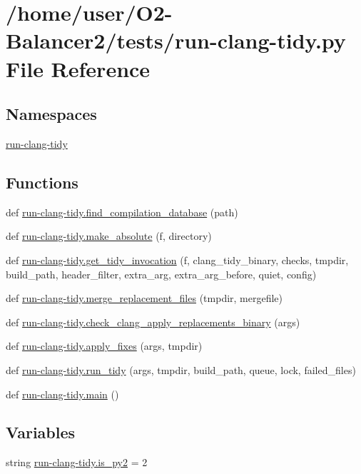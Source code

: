 \hypertarget{run-clang-tidy_8py}{}\section{/home/user/\+O2-\/\+Balancer2/tests/run-\/clang-\/tidy.py File Reference}
\label{run-clang-tidy_8py}
\subsection*{Namespaces}
\begin{DoxyCompactItemize}
\item 
 \hyperlink{namespacerun-clang-tidy}{run-\/clang-\/tidy}
\end{DoxyCompactItemize}
\subsection*{Functions}
\begin{DoxyCompactItemize}
\item 
def \hyperlink{namespacerun-clang-tidy_a6ac4a700cc424f234d870957b05abb6e}{run-\/clang-\/tidy.\+find\+\_\+compilation\+\_\+database} (path)
\item 
def \hyperlink{namespacerun-clang-tidy_a0cea255a2d9edf0a7f877bd9bdd4c75f}{run-\/clang-\/tidy.\+make\+\_\+absolute} (f, directory)
\item 
def \hyperlink{namespacerun-clang-tidy_a3cbee7957a6ad49d8a88b9c9d74a53dc}{run-\/clang-\/tidy.\+get\+\_\+tidy\+\_\+invocation} (f, clang\+\_\+tidy\+\_\+binary, checks, tmpdir, build\+\_\+path, header\+\_\+filter, extra\+\_\+arg, extra\+\_\+arg\+\_\+before, quiet, config)
\item 
def \hyperlink{namespacerun-clang-tidy_ad3aaf1ecd87ad237a6e5caeeaa4a6ad6}{run-\/clang-\/tidy.\+merge\+\_\+replacement\+\_\+files} (tmpdir, mergefile)
\item 
def \hyperlink{namespacerun-clang-tidy_ac9da9a27018bf1740f1f26c5f7657b7a}{run-\/clang-\/tidy.\+check\+\_\+clang\+\_\+apply\+\_\+replacements\+\_\+binary} (args)
\item 
def \hyperlink{namespacerun-clang-tidy_aae1fd407c48d69133cc1122940aa86ac}{run-\/clang-\/tidy.\+apply\+\_\+fixes} (args, tmpdir)
\item 
def \hyperlink{namespacerun-clang-tidy_a586db901d7ae78f0db162034b23cf68e}{run-\/clang-\/tidy.\+run\+\_\+tidy} (args, tmpdir, build\+\_\+path, queue, lock, failed\+\_\+files)
\item 
def \hyperlink{namespacerun-clang-tidy_a3a4dae083818b9d5c9104e0142e03e3b}{run-\/clang-\/tidy.\+main} ()
\end{DoxyCompactItemize}
\subsection*{Variables}
\begin{DoxyCompactItemize}
\item 
string \hyperlink{namespacerun-clang-tidy_aa041a8caae6885ce927c63a08f77dd83}{run-\/clang-\/tidy.\+is\+\_\+py2} = \textquotesingle{}2\textquotesingle{}
\end{DoxyCompactItemize}
